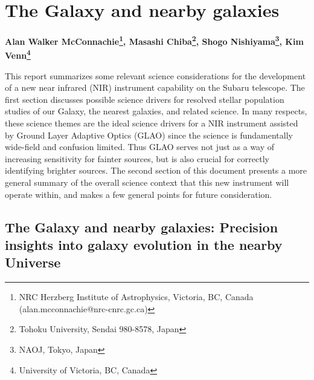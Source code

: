 \def\thisdir{science/ga/}
\newcommand*{\bull}{{\scriptsize $\bullet$\hspace{0.15cm}}}

\section{The Galaxy and nearby galaxies
\label{sec:ga}}

\noindent
\begin{center}
{\bf Alan Walker McConnachie\footnote{NRC Herzberg Institute of
 Astrophysics, Victoria, BC, Canada
 \noindent(alan.mcconnachie@nrc-cnrc.gc.ca)}, 
Masashi Chiba\footnote{Tohoku University, Sendai 980-8578, Japan}, 
Shogo Nishiyama\footnote{NAOJ, Tokyo, Japan}, 
Kim Venn\footnote{University of Victoria, BC, Canada}}
\end{center}
\vspace{0.5cm}


%



This report summarizes some relevant science considerations for the
development of a new near infrared (NIR) instrument capability on the
Subaru telescope. The first section discusses possible science drivers
for resolved stellar population studies of our Galaxy, the nearest
galaxies, and related science. In many respects, these science themes
are the ideal science drivers for a NIR instrument assisted by Ground
Layer Adaptive Optics (GLAO) since the science is fundamentally
wide-field and confusion limited. Thus GLAO serves not just as a way of
increasing sensitivity for fainter sources, but is also crucial for
correctly identifying brighter sources. The second section of this
document presents a more general summary of the overall science context
that this new instrument will operate within, and makes a few general
points for future consideration. 

\subsection{The Galaxy and nearby galaxies: Precision insights into galaxy evolution in the nearby Universe}

